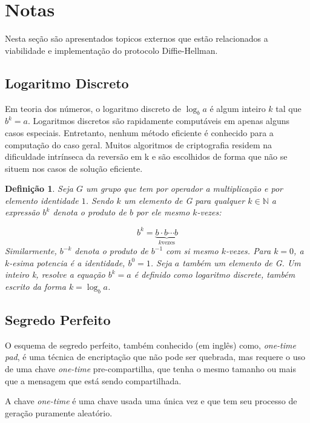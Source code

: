 \documentclass{article}
\newtheorem*{definition}{Definição}
\begin{document}




\section{Notas}%
\label{sec:notas}
Nesta seção são apresentados topicos externos que estão relacionados a
viabilidade e implementação do protocolo Diffie-Hellman.

\subsection{Logaritmo Discreto}%
\label{sub:logaritmo_discreto}
Em teoria dos números, o logaritmo discreto de $\log_{b}{a}$ é algum inteiro
$k$ tal que $b^k=a$. Logaritmos discretos são rapidamente computáveis em apenas
alguns casos especiais. Entretanto, nenhum método eficiente é conhecido para
a computação do caso geral. Muitos algoritmos de criptografia residem na
dificuldade intrínseca da reversão em k e são escolhidos de forma que não se
situem nos casos de solução eficiente.

\begin{definition}
    Seja $G$ um grupo que tem por operador a multiplicação e por elemento
    identidade $1$. Sendo $k$ um elemento de G para qualquer
    $k \in \mathbb{N}$ a expressão $b^k$ denota o produto de $b$ por ele mesmo
    $k$-vezes:

    \[
    b^{k}=\underbrace{b\cdot b\cdots b}_{k\text{vezes}}
    \]
    Similarmente, $b^{-k}$ denota o produto de $b^{-1}$ com si mesmo $k$-vezes.
    Para $k=0$, a $k$-esima potencia é a identidade, $b^0=1$. Seja $a$ também
    um elemento de G. Um inteiro k, resolve a equação $b^k=a$ é definido como
    logaritmo discrete, também escrito da forma $k=\log_b{a}$.
\end{definition}


\subsection{Segredo Perfeito}%
\label{sub:segredo_perfeito}
O esquema de segredo perfeito, também conhecido (em inglês) como, \textit{
one-time pad}, é uma técnica de encriptação que não pode ser quebrada, mas
requere o uso de uma chave \textit{one-time} pre-compartilha, que tenha o mesmo
tamanho ou mais que a mensagem que está sendo compartilhada.

A chave \textit{one-time} é uma chave usada uma única vez e que tem seu
processo de geração puramente aleatório.
\end{document}
